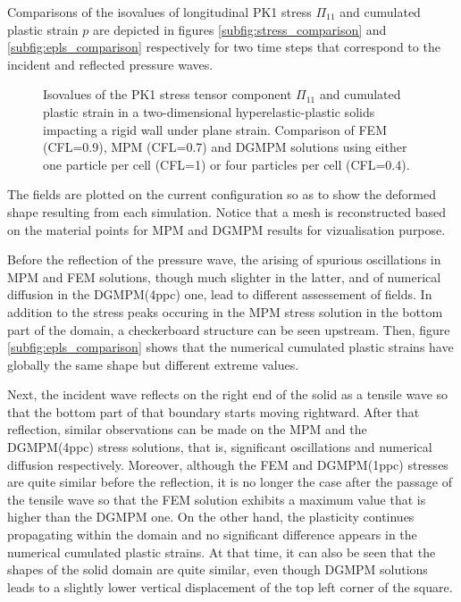 Comparisons of the isovalues of longitudinal PK1 stress $\Pi_{11}$ and cumulated plastic strain $p$ are depicted in figures \ref{subfig:stress_comparison} and \ref{subfig:epls_comparison} respectively for two time steps that correspond to the incident and reflected pressure waves.
\begin{figure}[ht]
  \centering
  \qquad
  \caption{Isovalues of the PK1 stress tensor component $\Pi_{11}$ and cumulated plastic strain in a two-dimensional hyperelastic-plastic solids impacting a rigid wall under plane strain. Comparison of FEM (CFL=0.9), MPM (CFL=0.7) and DGMPM solutions using either one particle per cell (CFL=1) or four particles per cell (CFL=0.4).}
  \label{fig:PS_taylor}
\end{figure}
The fields are plotted on the current configuration so as to show the deformed shape resulting from each simulation.
Notice that a mesh is reconstructed based on the material points for MPM and DGMPM results for vizualisation purpose.

Before the reflection of the pressure wave, the arising of spurious oscillations in MPM and FEM solutions, though much slighter in the latter, and of numerical diffusion in the DGMPM(4ppc) one, lead to different assessement of fields.
In addition to the stress peaks occuring in the MPM stress solution in the bottom part of the domain, a checkerboard structure can be seen upstream.
Then, figure \ref{subfig:epls_comparison} shows that the numerical cumulated plastic strains have globally the same shape but different extreme values.

Next, the incident wave reflects on the right end of the solid as a tensile wave so that the bottom part of that boundary starts moving rightward.
After that reflection, similar observations can be made on the MPM and the DGMPM(4ppc) stress solutions, that is, significant oscillations and numerical diffusion respectively.
Moreover, although the FEM and DGMPM(1ppc) stresses are quite similar before the reflection, it is no longer the case after the passage of the tensile wave so that the FEM solution exhibits a maximum value that is higher than the DGMPM one.
On the other hand, the plasticity continues propagating within the domain and no significant difference appears in the numerical cumulated plastic strains.
At that time, it can also be seen that the shapes of the solid domain are quite similar, even though DGMPM solutions leads to a slightly lower vertical displacement of the top left corner of the square.

